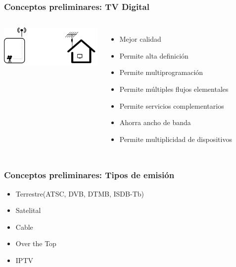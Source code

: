 \documentclass[a4paper,11pt]{beamer}
\begin{document}
		\begin{frame}
			\frametitle{Conceptos preliminares: TV Digital}



			\begin{columns}[c] %
					\includegraphics[width=5cm]{terrestre.png}
					\begin{itemize}
						\item Mejor calidad
						\item Permite alta definición
						\item Permite multiprogramación
						\item Permite múltiples flujos elementales
						\item Permite servicios complementarios
						\item Ahorra ancho de banda
						\item Permite multiplicidad de dispositivos
					\end{itemize}
			\end{columns}
		\end{frame}

		\begin{frame}
			\frametitle{Conceptos preliminares: Tipos de emisión}
			\begin{itemize}
				\item Terrestre(ATSC, DVB, DTMB, ISDB-Tb)
				\item Satelital
				\item Cable
				\item Over the Top
				\item IPTV
			\end{itemize}
		\end{frame}
\end{document}
